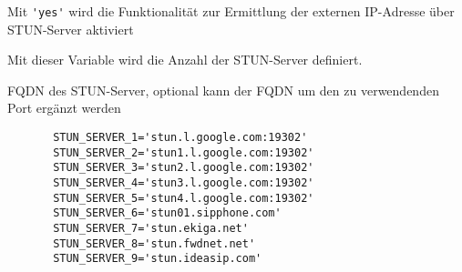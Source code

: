 \begin{description}

Mit \verb*?'yes'? wird die Funktionalität zur Ermittlung der externen
IP-Adresse über STUN-Server aktiviert


Mit dieser Variable wird die Anzahl der STUN-Server definiert.


FQDN des STUN-Server, optional kann der FQDN um den zu verwendenden Port
ergänzt werden

\begin{example}
\begin{verbatim}
       STUN_SERVER_1='stun.l.google.com:19302'
       STUN_SERVER_2='stun1.l.google.com:19302'
       STUN_SERVER_3='stun2.l.google.com:19302'
       STUN_SERVER_4='stun3.l.google.com:19302'
       STUN_SERVER_5='stun4.l.google.com:19302'
       STUN_SERVER_6='stun01.sipphone.com'
       STUN_SERVER_7='stun.ekiga.net'
       STUN_SERVER_8='stun.fwdnet.net'
       STUN_SERVER_9='stun.ideasip.com' 
\end{verbatim}
\end{example}

\end{description}


